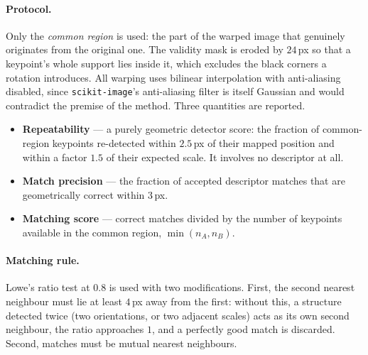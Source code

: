 \paragraph{Protocol.} Only the \emph{common region} is used: the part of the
warped image that genuinely originates from the original one. The validity
mask is eroded by $24$\,px so that a keypoint's whole support lies inside it,
which excludes the black corners a rotation introduces. All warping uses
bilinear interpolation with anti-aliasing disabled, since
\texttt{scikit-image}'s anti-aliasing filter is itself Gaussian and would
contradict the premise of the method. Three quantities are reported.

\begin{itemize}\itemsep2pt
\item \textbf{Repeatability} --- a purely geometric detector score: the
fraction of common-region keypoints re-detected within $2.5$\,px of their
mapped position and within a factor $1.5$ of their expected scale. It involves
no descriptor at all.
\item \textbf{Match precision} --- the fraction of accepted descriptor matches
that are geometrically correct within $3$\,px.
\item \textbf{Matching score} --- correct matches divided by the number of
keypoints available in the common region, $\min(n_A,n_B)$.
\end{itemize}

\paragraph{Matching rule.} Lowe's ratio test at $0.8$ is used with two
modifications. First, the second nearest neighbour must lie at least $4$\,px
away from the first: without this, a structure detected twice (two
orientations, or two adjacent scales) acts as its own second neighbour, the
ratio approaches $1$, and a perfectly good match is discarded. Second, matches
must be mutual nearest neighbours.

